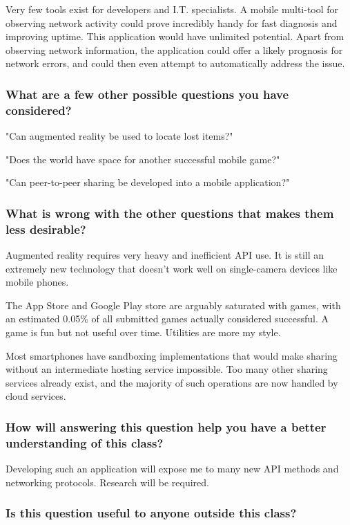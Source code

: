 \documentclass[letterpaper]{article}            %
\begin{document}
Very few tools exist for developers and I.T. specialists. A mobile multi-tool for observing network activity could prove incredibly handy for fast diagnosis and improving uptime. This application would have unlimited potential. Apart from observing network information, the application could offer a likely prognosis for network errors, and could then even attempt to automatically address the issue.

\subsubsection{What are a few other possible questions you have considered?}

"Can augmented reality be used to locate lost items?"

"Does the world have space for another successful mobile game?"

"Can peer-to-peer sharing be developed into a mobile application?"

\subsubsection{What is wrong with the other questions that makes them less desirable?}

Augmented reality requires very heavy and inefficient API use. It is still an extremely new technology that doesn't work well on single-camera devices like mobile phones.

The App Store and Google Play store are arguably saturated with games, with an estimated 0.05\% of all submitted games actually considered successful. A game is fun but not useful over time. Utilities are more my style.

Most smartphones have sandboxing implementations that would make sharing without an intermediate hosting service impossible. Too many other sharing services already exist, and the majority of such operations are now handled by cloud services.

\subsubsection{How will answering this question help you have a better understanding of this class?}

Developing such an application will expose me to many new API methods and networking protocols. Research will be required.

\subsubsection{Is this question useful to anyone outside this class?}
\end{document}
